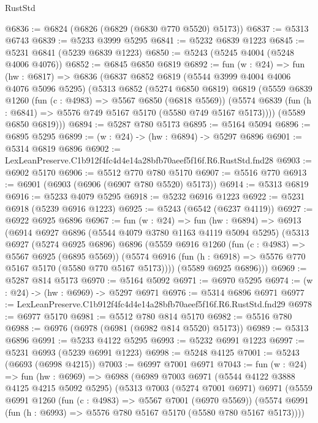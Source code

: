\begin{lexlean}{RustStd}
\begin{coremodule}
@6836 := @6824 (@6826 (@6829 (@6830 @770 @5520) @5173))
@6837 := @5313 @6743
@6839 := @5233 @3999 @5295
@6841 := @5232 @6839 @1223
@6845 := @5231 @6841 (@5239 @6839 @1223)
@6850 := @5243 (@5245 @4004 (@5248 @4006 @4076))
@6852 := @6845 @6850 @6819
@6892 := fun (w : @24) =>
  fun (hw : @6817) =>
  @6836
    (@6837
      @6852
      @6819
      (@5544 @3999 @4004 @4006 @4076 @5096 @5295)
      (@5313
        @6852
        (@5274 @6850 @6819)
        @6819
        (@5559
          @6839
          @1260
          (fun (c : @4983) => @5567 @6850 (@6818 @5569))
          (@5574 @6839 (fun (h : @6841) => @5576 @749 @5167 @5170 (@5580 @749 @5167 @5173))))
        (@5589 @6850 @6819)))
@6894 := @5287 @780 @5173
@6895 := @5164 @5094
@6896 := @6895 @5295
@6899 := (w : @24) -> (hw : @6894) -> @5297 @6896
@6901 := @5314 @6819 @6896
@6902 := LexLeanPreserve.C1b912f4fc4d4e14a28bfb70aeef5f16f.R6.RustStd.fnd28
@6903 := @6902 @5170
@6906 := @5512 @770 @780 @5170
@6907 := @5516 @770
@6913 := @6901 (@6903 (@6906 (@6907 @780 @5520) @5173))
@6914 := @5313 @6819
@6916 := @5233 @4079 @5295
@6918 := @5232 @6916 @1223
@6922 := @5231 @6918 (@5239 @6916 @1223)
@6925 := @5243 (@6542 (@6237 @4119))
@6927 := @6922 @6925 @6896
@6967 := fun (w : @24) =>
  fun (hw : @6894) =>
  @6913
    (@6914
      @6927
      @6896
      (@5544 @4079 @3780 @1163 @4119 @5094 @5295)
      (@5313
        @6927
        (@5274 @6925 @6896)
        @6896
        (@5559
          @6916
          @1260
          (fun (c : @4983) => @5567 @6925 (@6895 @5569))
          (@5574 @6916 (fun (h : @6918) => @5576 @770 @5167 @5170 (@5580 @770 @5167 @5173))))
        (@5589 @6925 @6896)))
@6969 := @5287 @814 @5173
@6970 := @5164 @5092
@6971 := @6970 @5295
@6974 := (w : @24) -> (hw : @6969) -> @5297 @6971
@6976 := @5314 @6896 @6971
@6977 := LexLeanPreserve.C1b912f4fc4d4e14a28bfb70aeef5f16f.R6.RustStd.fnd29
@6978 := @6977 @5170
@6981 := @5512 @780 @814 @5170
@6982 := @5516 @780
@6988 := @6976 (@6978 (@6981 (@6982 @814 @5520) @5173))
@6989 := @5313 @6896
@6991 := @5233 @4122 @5295
@6993 := @5232 @6991 @1223
@6997 := @5231 @6993 (@5239 @6991 @1223)
@6998 := @5248 @4125
@7001 := @5243 (@6693 (@6998 @4215))
@7003 := @6997 @7001 @6971
@7043 := fun (w : @24) =>
  fun (hw : @6969) =>
  @6988
    (@6989
      @7003
      @6971
      (@5544 @4122 @3888 @4125 @4215 @5092 @5295)
      (@5313
        @7003
        (@5274 @7001 @6971)
        @6971
        (@5559
          @6991
          @1260
          (fun (c : @4983) => @5567 @7001 (@6970 @5569))
          (@5574 @6991 (fun (h : @6993) => @5576 @780 @5167 @5170 (@5580 @780 @5167 @5173))))

\end{coremodule}
\end{lexlean}
